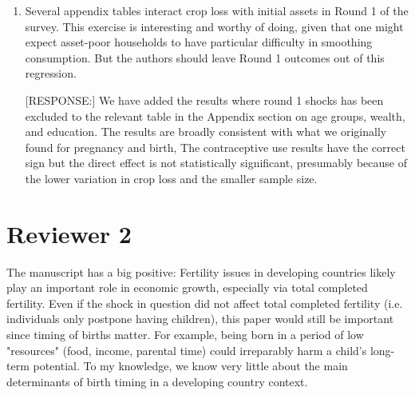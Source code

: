 \documentclass[letterpaper,12pt]{article}
\begin{document}
\begin{enumerate}
\item Several appendix tables interact crop loss with initial assets in
Round 1 of the survey. This exercise is interesting and worthy of doing,
given that one might expect asset-poor households to have particular
difficulty in smoothing consumption. But the authors should leave Round
1 outcomes out of this regression.

[RESPONSE:] We have added the results where round 1 shocks has been 
excluded to the relevant table in the Appendix section on age
groups, wealth, and education.
The results are broadly consistent with what we originally found
for pregnancy and birth, 
The contraceptive use results have the correct sign but the direct
effect is not statistically significant, presumably because of the 
lower variation in crop loss and the smaller sample size.


\end{enumerate}



\newpage

\section*{Reviewer 2}


The manuscript has a big positive: Fertility issues in developing
countries likely play an important role in economic growth, especially
via total completed fertility. Even if the shock in question did not
affect total completed fertility (i.e. individuals only postpone having
children), this paper would still be important since timing of births
matter. For example, being born in a period of low "resources" (food,
income, parental time) could irreparably harm a child's long-term
potential. To my knowledge, we know very little about the main
determinants of birth timing in a developing country context.
\end{document}

